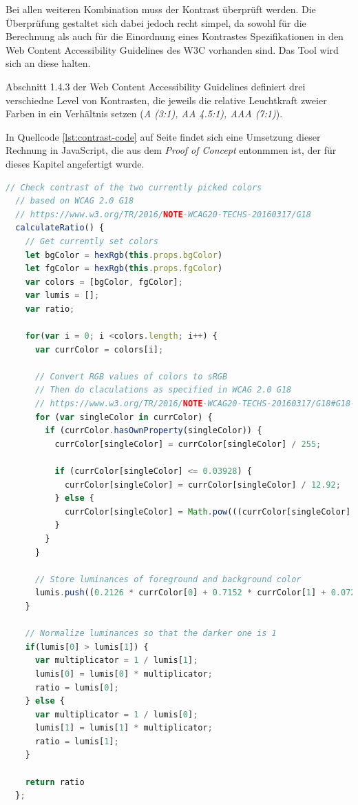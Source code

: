 Bei allen weiteren Kombination muss der Kontrast überprüft werden. Die Überprüfung gestaltet sich dabei jedoch recht simpel, da sowohl für die Berechnung als auch für die Einordnung eines Kontrastes Spezifikationen in den Web Content Accessibility Guidelines des W3C \cite{w3c2016g18} vorhanden sind. Das Tool wird sich an diese halten.

Abschnitt 1.4.3 der Web Content Accessibility Guidelines definiert drei verschiedne Level von Kontrasten, die jeweils die relative Leuchtkraft zweier Farben in ein Verhältnis setzen (\textit{A (3:1), AA 4.5:1), AAA (7:1)}).

In Quellcode \ref{lst:contrast-code} auf Seite \pageref{lst:contrast-code} findet sich eine Umsetzung dieser Rechnung in JavaScript, die aus dem \textit{Proof of Concept} entonmmen ist, der für dieses Kapitel angefertigt wurde.

\begin{lstlisting}[caption={Berechnung des Kontrastverhältnisses zweier Farben nach WCAG 2.0 in JavaScript}, label={lst:contrast-code}, language=javascript]
  // Check contrast of the two currently picked colors
  // based on WCAG 2.0 G18
  // https://www.w3.org/TR/2016/NOTE-WCAG20-TECHS-20160317/G18
  calculateRatio() {
    // Get currently set colors
    let bgColor = hexRgb(this.props.bgColor)
    let fgColor = hexRgb(this.props.fgColor)
    var colors = [bgColor, fgColor];
    var lumis = [];
    var ratio;

    for(var i = 0; i <colors.length; i++) {
      var currColor = colors[i];

      // Convert RGB values of colors to sRGB
      // Then do claculations as specified in WCAG 2.0 G18
      // https://www.w3.org/TR/2016/NOTE-WCAG20-TECHS-20160317/G18#G18-tests
      for (var singleColor in currColor) {
        if (currColor.hasOwnProperty(singleColor)) {
          currColor[singleColor] = currColor[singleColor] / 255;

          if (currColor[singleColor] <= 0.03928) {
            currColor[singleColor] = currColor[singleColor] / 12.92;
          } else {
            currColor[singleColor] = Math.pow(((currColor[singleColor] + 0.055) / 1.055), 2.4);
          }
        }
      }

      // Store luminances of foreground and background color
      lumis.push((0.2126 * currColor[0] + 0.7152 * currColor[1] + 0.0722 * currColor[2]) + 0.05);
    }

    // Normalize luminances so that the darker one is 1
    if(lumis[0] > lumis[1]) {
      var multiplicator = 1 / lumis[1];
      lumis[0] = lumis[0] * multiplicator;
      ratio = lumis[0];
    } else {
      var multiplicator = 1 / lumis[0];
      lumis[1] = lumis[1] * multiplicator;
      ratio = lumis[1];
    }

    return ratio
  };
\end{lstlisting}

